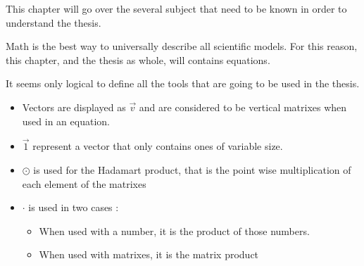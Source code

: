 \label{cap:state}

This chapter will go over the several subject that need to be known in order to understand the thesis.

Math is the best way to universally describe all scientific models. For this reason, this chapter, and the thesis as whole, will contains equations.

It seems only logical to define all the tools that are going to be used in the thesis.

\begin{itemize}
\item Vectors are displayed as $\overrightarrow{v}$ and are considered to be vertical matrixes when used in an equation.
\item $\overrightarrow{1}$ represent a vector that only contains ones of variable size.
\item $\odot$ is used for the Hadamart product, that is the point wise multiplication of each element of the matrixes
\item $\cdot$ is used in two cases :
\begin{itemize}
\item When used with a number, it is the product of those numbers.
\item When used with matrixes, it is the matrix product
\end{itemize}
\end{itemize}











\cleardoublepage
